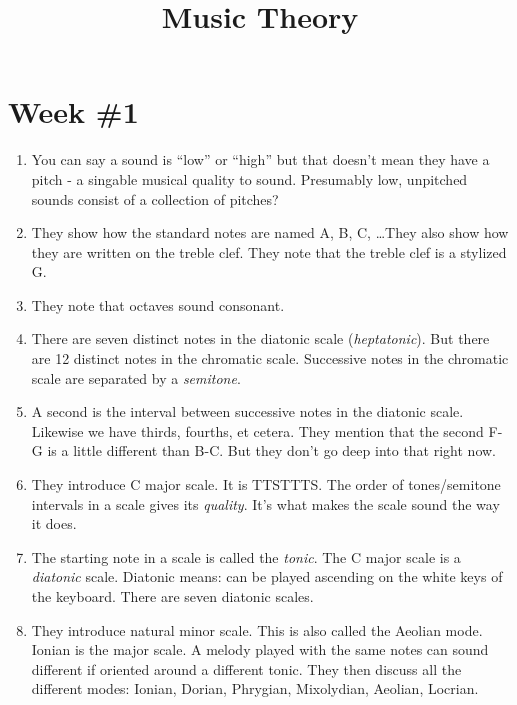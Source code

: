 \documentclass[11pt, oneside]{amsart}
\renewcommand{\define}[1]{\emph{#1}}
\newcommand{\7}{$^7$}
\begin{document}
\title{Music Theory}
\maketitle

\section{Week \#1}

\begin{enumerate}
  \item You can say a sound is ``low'' or ``high'' but that doesn't mean
  they have a pitch - a singable musical quality to sound. Presumably
  low, unpitched sounds consist of a collection of pitches?

  \item They show how the standard notes are named A, B, C, \ldots They
  also show how they are written on the treble clef. They note that the
  treble clef is a stylized G.

  \item They note that octaves sound consonant.

  \item There are seven distinct notes in the diatonic scale
  (\define{heptatonic}). But there are 12 distinct notes in the
  chromatic scale. Successive notes in the chromatic scale are separated
  by a \define{semitone}.

  \item A second is the interval between successive notes in the
  diatonic scale. Likewise we have thirds, fourths, et cetera. They
  mention that the second F-G is a little different than B-C. But they
  don't go deep into that right now.

  \item They introduce C major scale. It is TTSTTTS. The order of
  tones/semitone intervals in a scale gives its \define{quality}. It's
  what makes the scale sound the way it does.

  \item The starting note in a scale is called the \define{tonic}. The C
  major scale is a \define{diatonic} scale. Diatonic means: can be
  played ascending on the white keys of the keyboard. There are seven
  diatonic scales.

  \item They introduce natural minor scale. This is also called the
  Aeolian mode. Ionian is the major scale. A melody played with the same
  notes can sound different if oriented around a different tonic. They
  then discuss all the different modes: Ionian, Dorian, Phrygian,
  Mixolydian, Aeolian, Locrian.


\end{enumerate}
\end{document}
